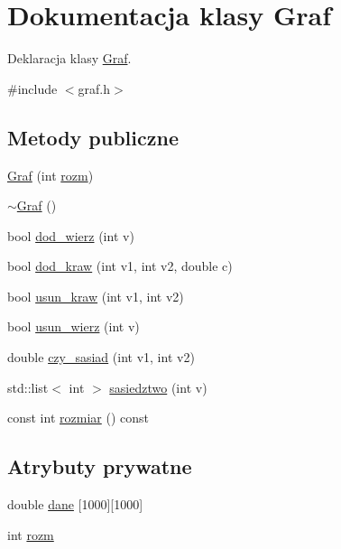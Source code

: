 \hypertarget{class_graf}{\section{\-Dokumentacja klasy \-Graf}
\label{class_graf}
}


\-Deklaracja klasy \hyperlink{class_graf}{\-Graf}.  




{\ttfamily \#include $<$graf.\-h$>$}

\subsection*{\-Metody publiczne}
\begin{DoxyCompactItemize}
\item 
\hyperlink{class_graf_a697a2852c7f65779f23e30fd0e8dd081}{\-Graf} (int \hyperlink{class_graf_aac4d211e752539963f002d255991f5b4}{rozm})
\item 
\hyperlink{class_graf_a4ff3904fd04f367ac0219b52719c567e}{$\sim$\-Graf} ()
\item 
bool \hyperlink{class_graf_a27d67c3b74894008a177b4a6b3a5a8ec}{dod\-\_\-wierz} (int v)
\item 
bool \hyperlink{class_graf_a9f9097c607ea725e4aaf738fb6c4fa49}{dod\-\_\-kraw} (int v1, int v2, double c)
\item 
bool \hyperlink{class_graf_aa2a49b2df35ed0f4c308696bf21694f6}{usun\-\_\-kraw} (int v1, int v2)
\item 
bool \hyperlink{class_graf_a670df5348dbd4cf3bcc8c223cb04e10f}{usun\-\_\-wierz} (int v)
\item 
double \hyperlink{class_graf_adc0aaf7f7f62343b149538c63c61deda}{czy\-\_\-sasiad} (int v1, int v2)
\item 
std\-::list$<$ int $>$ \hyperlink{class_graf_a98e19234c0961a4e42dda003cbabd274}{sasiedztwo} (int v)
\item 
const int \hyperlink{class_graf_ab452377f7bf7a7034057c9b1c1f2c4fb}{rozmiar} () const 
\end{DoxyCompactItemize}
\subsection*{\-Atrybuty prywatne}
\begin{DoxyCompactItemize}
\item 
double \hyperlink{class_graf_aa9bee9eccd66c284e079ba25d7519dcb}{dane} \mbox{[}1000\mbox{]}\mbox{[}1000\mbox{]}
\item 
int \hyperlink{class_graf_aac4d211e752539963f002d255991f5b4}{rozm}
\end{DoxyCompactItemize}


